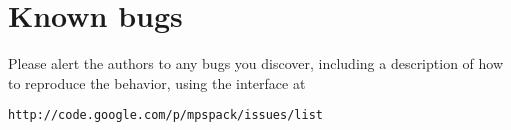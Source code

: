 \documentclass[12pt]{article}
\begin{document}
\section{Known bugs}

Please alert the authors to any bugs you discover, including a description
of how to reproduce the behavior, using the interface at

{\tt http://code.google.com/p/mpspack/issues/list}

 

\end{document}
